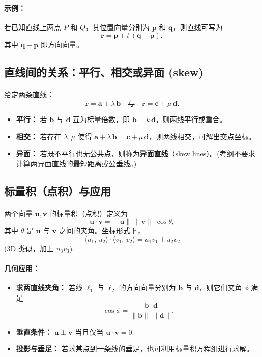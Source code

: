 \documentclass[8pt,a4paper,twoside]{tau-class/tau}
\begin{document}
\paragraph{示例：}
若已知直线上两点 \(P\) 和 \(Q\)，其位置向量分别为 \(\mathbf{p}\) 和 \(\mathbf{q}\)，则直线可写为
\[
\mathbf{r} = \mathbf{p} + t\,(\mathbf{q}−\mathbf{p}),
\]
其中 \(\mathbf{q}−\mathbf{p}\) 即方向向量。

\subsection{直线间的关系：平行、相交或异面 (skew)}
\paragraph{}
给定两条直线：
\[
\mathbf{r} = \mathbf{a} + \lambda\,\mathbf{b}
\quad\text{与}\quad
\mathbf{r} = \mathbf{c} + \mu\,\mathbf{d}.
\]
\begin{itemize}
    \item \textbf{平行：} 若 \(\mathbf{b}\) 与 \(\mathbf{d}\) 互为标量倍数，即 \(\mathbf{b} = k\,\mathbf{d}\)，则两线平行或重合。
    \item \textbf{相交：} 若存在 \(\lambda,\mu\) 使得 \(\mathbf{a} + \lambda\,\mathbf{b} = \mathbf{c} + \mu\,\mathbf{d}\)，则两线相交，可解出交点坐标。
    \item \textbf{异面：} 若既不平行也无公共点，则称为\textbf{异面直线}（skew lines）。(考纲不要求计算两异面直线的最短距离或公垂线。)
\end{itemize}

\subsection{标量积（点积）与应用}
\paragraph{}
两个向量 \(\mathbf{u},\mathbf{v}\) 的标量积（点积）定义为
\[
\mathbf{u}\cdot\mathbf{v} = \|\mathbf{u}\|\;\|\mathbf{v}\|\;\cos\theta,
\]
其中 \(\theta\) 是 \(\mathbf{u}\) 与 \(\mathbf{v}\) 之间的夹角。坐标形式下，
\[
\langle u_1,\,u_2\rangle \cdot \langle v_1,\,v_2\rangle = u_1v_1 + u_2v_2
\]
(3D 类似，加上 \(u_3v_3\)).\\[4pt]
\paragraph{几何应用：}
\begin{itemize}
    \item \textbf{求两直线夹角：} 若线 \(\ell_1\) 与 \(\ell_2\) 的方向向量分别为 \(\mathbf{b}\) 与 \(\mathbf{d}\)，则它们夹角 \(\phi\) 满足
    \[
    \cos \phi = \frac{\mathbf{b}\cdot \mathbf{d}}{\|\mathbf{b}\|\;\|\mathbf{d}\|}.
    \]
    \item \textbf{垂直条件：} \(\mathbf{u}\perp \mathbf{v}\) 当且仅当 \(\mathbf{u}\cdot \mathbf{v}=0\).
    \item \textbf{投影与垂足：} 若求某点到一条线的垂足，也可利用标量积方程组进行求解。
\end{itemize}
\end{document}
